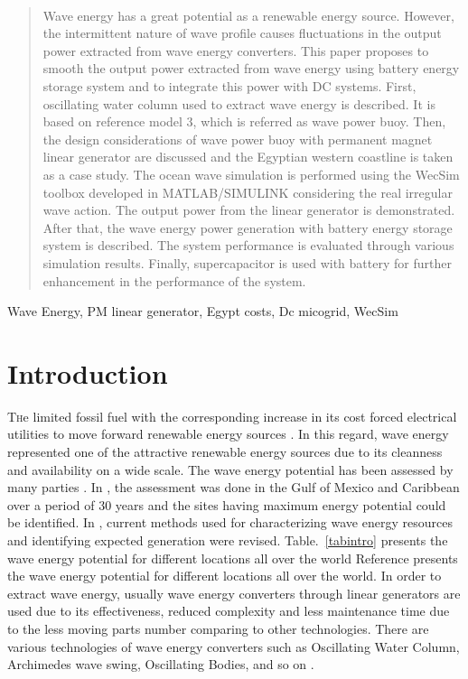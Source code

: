 \documentclass[conference]{IEEEtran}
\begin{document}
\maketitle
\
\begin{abstract}
Wave energy has a great potential as a renewable energy source. However, the intermittent nature of wave profile causes fluctuations in the output power extracted from wave energy converters. This paper proposes to smooth the output power extracted from wave energy using battery energy storage system and to integrate this power with DC systems. First, oscillating water column used to extract wave energy is described. It is based on reference model 3, which is referred as wave power buoy. Then, the design considerations of wave power buoy with permanent magnet linear generator are discussed and the Egyptian western coastline is taken as a case study. The ocean wave simulation is performed using the WecSim toolbox developed in MATLAB/SIMULINK considering the real irregular wave action. The output power from the linear generator is demonstrated. After that, the wave energy power generation with battery energy storage system is described. The system performance is evaluated through various simulation results. Finally, supercapacitor is used with battery for further enhancement in the performance of the system.
\end{abstract}

\begin{IEEEkeywords}
Wave Energy, PM linear generator, Egypt costs, Dc micogrid, WecSim
\end{IEEEkeywords}
\BgThispage
\section{Introduction}
\lettrine{T}he limited fossil fuel with the corresponding increase in its cost forced electrical utilities to move forward renewable energy sources \cite{elkholy2020general,elkholy2018advanced}. In this regard, wave energy represented one of the attractive renewable energy sources due to its cleanness and availability on a wide scale. The wave energy potential has been assessed by many parties \cite{1,2,eslkoly2017islanding}. In \cite{1}, the assessment was done in the Gulf of Mexico and Caribbean over a period of 30 years and the sites having maximum energy potential could be identified. In \cite{2}, current methods used for characterizing wave energy resources and identifying expected generation were revised. Table.~\ref{tabintro} presents the wave energy potential for different locations all over the world \cite{3} Reference \cite{3}  presents the wave energy potential for different locations all over the world. In order to extract wave energy, usually wave energy converters through linear generators are used due to its effectiveness, reduced complexity and  less maintenance time due to the less moving parts number comparing to other technologies. There are various technologies of wave energy converters such as Oscillating Water Column, Archimedes wave swing, Oscillating Bodies, and so on \cite{3}.
\end{document}
